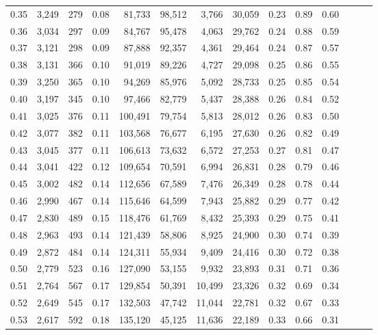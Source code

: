 \begin{tabular}{rrrrrrrrrrrrrr}
0.35 &  3,249 &  279 &  0.08 &   81,733 &   98,512 &   3,766 &  30,059 &  0.23 &  0.89 &      0.60 \\
0.36 &  3,034 &  297 &  0.09 &   84,767 &   95,478 &   4,063 &  29,762 &  0.24 &  0.88 &      0.59 \\
0.37 &  3,121 &  298 &  0.09 &   87,888 &   92,357 &   4,361 &  29,464 &  0.24 &  0.87 &      0.57 \\
0.38 &  3,131 &  366 &  0.10 &   91,019 &   89,226 &   4,727 &  29,098 &  0.25 &  0.86 &      0.55 \\
0.39 &  3,250 &  365 &  0.10 &   94,269 &   85,976 &   5,092 &  28,733 &  0.25 &  0.85 &      0.54 \\
0.40 &  3,197 &  345 &  0.10 &   97,466 &   82,779 &   5,437 &  28,388 &  0.26 &  0.84 &      0.52 \\
0.41 &  3,025 &  376 &  0.11 &  100,491 &   79,754 &   5,813 &  28,012 &  0.26 &  0.83 &      0.50 \\
0.42 &  3,077 &  382 &  0.11 &  103,568 &   76,677 &   6,195 &  27,630 &  0.26 &  0.82 &      0.49 \\
0.43 &  3,045 &  377 &  0.11 &  106,613 &   73,632 &   6,572 &  27,253 &  0.27 &  0.81 &      0.47 \\
0.44 &  3,041 &  422 &  0.12 &  109,654 &   70,591 &   6,994 &  26,831 &  0.28 &  0.79 &      0.46 \\
0.45 &  3,002 &  482 &  0.14 &  112,656 &   67,589 &   7,476 &  26,349 &  0.28 &  0.78 &      0.44 \\
0.46 &  2,990 &  467 &  0.14 &  115,646 &   64,599 &   7,943 &  25,882 &  0.29 &  0.77 &      0.42 \\
0.47 &  2,830 &  489 &  0.15 &  118,476 &   61,769 &   8,432 &  25,393 &  0.29 &  0.75 &      0.41 \\
0.48 &  2,963 &  493 &  0.14 &  121,439 &   58,806 &   8,925 &  24,900 &  0.30 &  0.74 &      0.39 \\
0.49 &  2,872 &  484 &  0.14 &  124,311 &   55,934 &   9,409 &  24,416 &  0.30 &  0.72 &      0.38 \\
0.50 &  2,779 &  523 &  0.16 &  127,090 &   53,155 &   9,932 &  23,893 &  0.31 &  0.71 &      0.36 \\
0.51 &  2,764 &  567 &  0.17 &  129,854 &   50,391 &  10,499 &  23,326 &  0.32 &  0.69 &      0.34 \\
0.52 &  2,649 &  545 &  0.17 &  132,503 &   47,742 &  11,044 &  22,781 &  0.32 &  0.67 &      0.33 \\
0.53 &  2,617 &  592 &  0.18 &  135,120 &   45,125 &  11,636 &  22,189 &  0.33 &  0.66 &      0.31 \\

\end{tabular}
